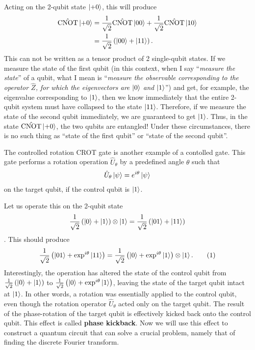 \documentclass[12pt,oneside]{book}
\newcommand\numberthis{\addtocounter{equation}{1}\tag{\theequation}}
\begin{document}
Acting on the 2-qubit state $\ket{+0}$, this will produce
\begin{align*}
    \hat{\mathrm{CNOT}} \ket{+0} &{}= \frac{1}{\sqrt{2}} \hat{\mathrm{CNOT}} \ket{00} + \frac{1}{\sqrt{2}} \hat{\mathrm{CNOT}} \ket{10}\\
    &{}= \frac{1}{\sqrt{2}} \left(\ket{00}+\ket{11}\right).
\end{align*}
This can not be written as a tensor product of 2 single-qubit states. If we measure the state of the first qubit (in this context, when I say ``\textit{measure the state}'' of a qubit, what I mean is ``\textit{measure the observable corresponding to the operator $\hat{Z}$, for which the eigenvectors are $\ket{0}$ and $\ket{1}$}'') and get, for example, the eigenvalue corresponding to $\ket{1}$, then we know immediately that the entire 2-qubit system must have collapsed to the state $\ket{11}$. Therefore, if we measure the state of the second qubit immediately, we are guaranteed to get $\ket{1}$. Thus, in the state $\hat{\mathrm{CNOT}}\ket{+0}$, the two qubits are entangled! Under these circumstances, there is no such thing as ``state of the first qubit'' or ``state of the second qubit''.

The controlled rotation CROT gate is another example of a contolled gate. This gate performs a rotation operation $\hat{U}_\theta$ by a predefined angle $\theta$ such that
\begin{align}\label{kickback1}   \hat{U}_\theta\ket{\psi}=e^{i\theta}\ket{\psi}
\end{align}
on the target qubit, if the control qubit is $\ket{1}$.

Let us operate this on the 2-qubit state $$\frac{1}{\sqrt{2}}\left(\ket{0}+\ket{1}\right)\otimes\ket{1} = \frac{1}{\sqrt{2}}\left(\ket{01}+\ket{11}\right)$$. This should produce
\begin{align*}\label{kickback2}
    \frac{1}{\sqrt{2}}\left(\ket{01}+\exp^{i\theta}\ket{11}\right) = \frac{1}{\sqrt{2}} \left(\ket{0}+\exp^{i\theta}\ket{1}\right)\otimes\ket{1}.\numberthis
\end{align*}
Interestingly, the operation has altered the state of the control qubit from $\frac{1}{\sqrt{2}}\left(\ket{0}+\ket{1}\right)$ to $\frac{1}{\sqrt{2}}\left(\ket{0}+\exp^{i\theta}\ket{1}\right)$, leaving the state of the target qubit intact at $\ket{1}$. In other words, a rotation was essentially applied to the control qubit, even though the rotation operator $\hat{U}_\theta$ acted only on the target qubit. The result of the phase-rotation of the target qubit is effectively kicked back onto the control qubit. This effect is called \textbf{phase kickback}.
Now we will use this effect to construct a quantum circuit that can solve a crucial problem, namely that of finding the discrete Fourier transform.
\end{document}
